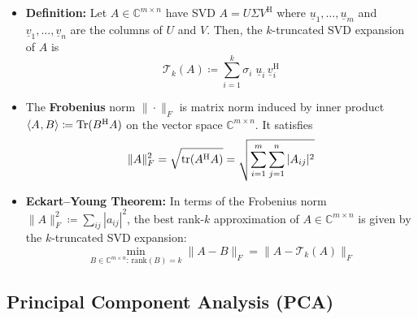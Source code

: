 \documentclass[11pt,twoside]{report}
\newcommand{\vecnot}{\underline}
\newcommand{\Herm}{{\mathrm{H}}}
\newcommand{\tinner}[2]{{\langle #1 \mskip1mu , #2 \rangle}}
\begin{document}
\begin{itemize}
\item \textbf{Definition:} Let $A \in \mathbb{C}^{m\times n}$ have SVD $A=U \Sigma V^\Herm$ where $\vecnot{u}_1,\ldots,\vecnot{u}_m$ and $\vecnot{v}_1,\ldots,\vecnot{v}_n$ are the columns of $U$ and $V$.
Then, the $k$-truncated SVD expansion of $A$ is 
\[ \mathcal{T}_k (A) \coloneqq \sum_{i=1}^k \sigma_i \; \vecnot{u}_i \, \vecnot{v}_i^\Herm \]


\item%
The \textbf{Frobenius} norm $\|\cdot\|_F$ %
 is matrix norm induced by inner product $\tinner{ A }{ B } \coloneqq \text{Tr} (B^\Herm A)$ on the vector space $\mathbb{C}^{m \times n}$. It satisfies
 \begin{align*}
 \| A\|^2_F  =  \sqrt{ \gtr(A^\Herm A) } = \sqrt{ \sum_{i=1}^m \sum_{j=1}^n |A_{ij}|^2}
 \end{align*}

\item \textbf{Eckart–Young Theorem:} In terms of the Frobenius norm $\| A \|_F^2 \coloneqq \sum_{ij} |a_{ij}|^2$, the best rank-$k$ approximation of $A \in \mathbb{C}^{m\times n}$ is given by the $k$-truncated SVD expansion: 
\[ \min_{B \in \mathbb{C}^{m\times n}: \, \text{rank}(B)=k} \| A - B \|_F  = \| A - \mathcal{T}_k (A) \|_F \]

\end{itemize}


\subsection{Principal Component Analysis (PCA)} 
\end{document}

